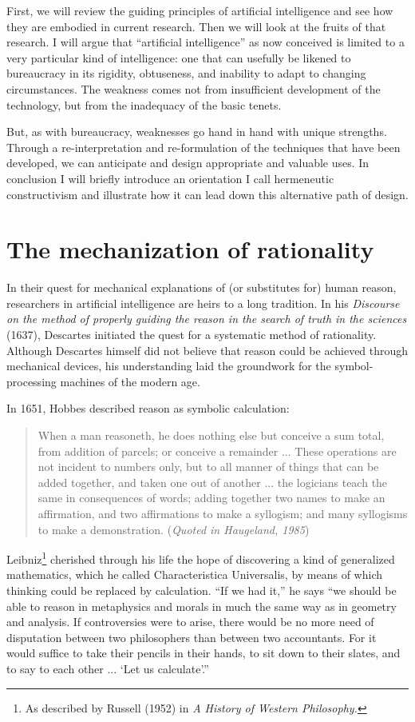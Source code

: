 \documentclass[12pt]{article}
\begin{document}
First, we will review the guiding principles of artificial intelligence and see how they are embodied in current research. Then we will look at the fruits of that research. I will argue that ``artificial intelligence'' as now conceived is limited to a very particular kind of intelligence: one that can usefully be likened to bureaucracy in its rigidity, obtuseness, and inability to adapt to changing circumstances. The weakness comes not from insufficient development of the technology, but from the inadequacy of the basic tenets.

But, as with bureaucracy, weaknesses go hand in hand with unique strengths. Through a re-interpretation and re-formulation of the techniques that have been developed, we can anticipate and design appropriate and valuable uses. In conclusion I will briefly introduce an orientation I call hermeneutic constructivism and illustrate how it can lead down this alternative path of design.

\section{The mechanization of rationality}

In their quest for mechanical explanations of (or substitutes for) human reason, researchers in artificial intelligence are heirs to a long tradition. In his {\it Discourse on the method of properly guiding the reason in the search of truth in the sciences} (1637), Descartes initiated the quest for a systematic method of rationality. Although Descartes himself did not believe that reason could be achieved through mechanical devices, his understanding laid the groundwork for the symbol-processing machines of the modern age.

In 1651, Hobbes described reason as symbolic calculation:

\begin{quote}
When a man reasoneth, he does nothing else but conceive a sum total, from addition of parcels; or conceive a remainder ... These operations are not incident to numbers only, but to all manner of things that can be added together, and taken one out of another ... the logicians teach the same in consequences of words; adding together two names to make an affirmation, and two affirmations to make a syllogism; and many syllogisms to make a demonstration. ({\it Quoted in Haugeland, 1985})
\end{quote}

\noindent
Leibniz\footnote{As described by Russell (1952) in {\it A History of Western Philosophy.}} cherished through his life the hope of discovering a kind of generalized mathematics, which he called Characteristica Universalis, by means of which thinking could be replaced by calculation. ``If we had it,'' he says ``we should be able to reason in metaphysics and morals in much the same way as in geometry and analysis. If controversies were to arise, there would be no more need of disputation between two philosophers than between two accountants. For it would suffice to take their pencils in their hands, to sit down to their slates, and to say to each other ... ‘Let us calculate’.''
\end{document}
